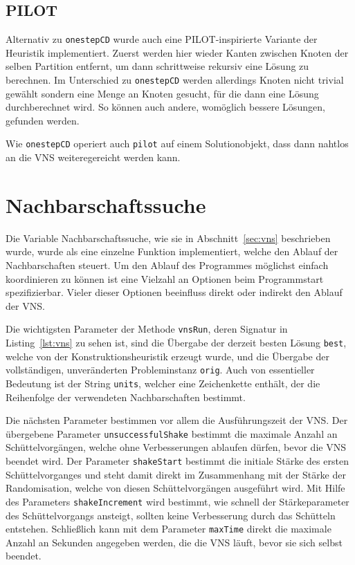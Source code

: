 \subsection{PILOT}
Alternativ zu \texttt{onestepCD} wurde auch eine PILOT-inspirierte Variante der Heuristik implementiert. Zuerst werden hier wieder Kanten zwischen Knoten der selben Partition entfernt, um dann schrittweise rekursiv eine Lösung zu berechnen. Im Unterschied zu \texttt{onestepCD} werden allerdings Knoten nicht trivial gewählt sondern eine Menge an Knoten gesucht, für die dann eine Lösung durchberechnet wird. So können auch andere, womöglich bessere Lösungen, gefunden werden.

Wie \texttt{onestepCD} operiert auch \texttt{pilot} auf einem Solutionobjekt, dass dann nahtlos an die VNS weiteregereicht werden kann.

\section{Nachbarschaftssuche}
\label{sec:impl:vns}

Die Variable Nachbarschaftssuche, wie sie in Abschnitt~\ref{sec:vns} beschrieben wurde, wurde als eine einzelne Funktion implementiert, welche den Ablauf der Nachbarschaften steuert. Um den Ablauf des Programmes
möglichst einfach koordinieren zu können ist eine Vielzahl an Optionen beim Programmstart spezifizierbar. Vieler dieser Optionen beeinfluss direkt oder indirekt den Ablauf der VNS. 

Die wichtigsten Parameter der Methode \texttt{vnsRun}, deren Signatur in Listing~\ref{lst:vns} zu sehen ist, sind die Übergabe der derzeit besten Lösung \texttt{best}, welche von der Konstruktionsheuristik erzeugt wurde, und
die Übergabe der vollständigen, unveränderten Probleminstanz \texttt{orig}. Auch von essentieller Bedeutung ist der String \texttt{units}, welcher eine Zeichenkette enthält, der die Reihenfolge der verwendeten Nachbarschaften bestimmt. 

Die nächsten Parameter bestimmen vor allem die Ausführungszeit der VNS. Der übergebene Parameter \texttt{unsuccessfulShake} bestimmt die maximale Anzahl an Schüttelvorgängen, welche ohne Verbesserungen ablaufen dürfen, bevor die VNS beendet wird.
Der Parameter \texttt{shakeStart} bestimmt die initiale Stärke des ersten Schüttelvorganges und steht damit direkt im Zusammenhang mit der Stärke der Randomisation, welche von diesen Schüttelvorgängen ausgeführt wird.
Mit Hilfe des Parameters \texttt{shakeIncrement} wird bestimmt, wie schnell der Stär\-ke\-para\-me\-ter des Schüttelvorgangs ansteigt, sollten keine Verbesserung durch das Schütteln entstehen.
Schließlich kann mit dem Parameter \texttt{maxTime} direkt die maximale Anzahl an Sekunden angegeben werden, die die VNS läuft, bevor sie sich selbst beendet. 

